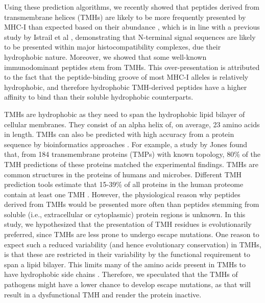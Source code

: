 
Using these prediction algorithms, 
we recently showed that peptides derived 
from transmembrane helices (TMHs) 
are likely to be more frequently presented by MHC-I 
than expected based on their abundance \cite{bianchi2017},
which is in line with a previous study 
by Istrail et al \cite{istrail2004comparative},
demonstrating that N-terminal signal sequences 
are likely to be presented within major histocompatibility complexes, 
due their hydrophobic nature. 
Moreover, we showed that some well-known immunodominant peptides stem from TMHs. 
This over-presentation is attributed to the fact 
that the peptide-binding groove of most MHC-I alleles
is relatively hydrophobic, 
and therefore hydrophobic TMH-derived peptides have a higher affinity 
to bind than their soluble hydrophobic 
counterparts. 

TMHs are hydrophobic 
as they need to span the hydrophobic lipid bilayer of cellular membranes.
They consist of an alpha helix of, on average, 23 amino acids in length. 
TMHs can also be predicted with high accuracy from a protein sequence 
by bioinformatics approaches \cite{krogh2001predicting,kall2004combined,arai2004conpred,jones2007improving,klammer2009metatm,wang2019efficient}. 
For example, a study by Jones \cite{jones2007improving} found that,
from 184 transmembrane proteins (TMPs) with known topology, 
80\% of the TMH predictions of these proteins
matched the experimental findings.
TMHs are common structures in the proteins of humans and microbes. 
Different TMH prediction tools estimate that 15-39\% of all proteins 
in the human proteome contain at least one TMH \cite{ahram2006estimation}.
However, the physiological reason why peptides derived from TMHs 
would be presented more often than peptides 
stemming from soluble (i.e., extracellular or cytoplasmic) protein regions is unknown. 
In this study, we hypothesized that the presentation of 
TMH residues is evolutionarily preferred, 
since TMHs are less prone to undergo escape mutations. 
One reason to expect such a reduced 
variability (and hence evolutionary conservation) in TMHs, 
is that these are restricted in their variability 
by the functional requirement to span a lipid bilayer. 
This limits 
many of the amino acids present in TMHs 
to have hydrophobic side chains 
\cite{hessa2007molecular,jones1994model}.
Therefore, we speculated that the TMHs of pathogens 
might have a lower chance to develop escape mutations, 
as that will result in a dysfunctional TMH 
and render the protein inactive.

